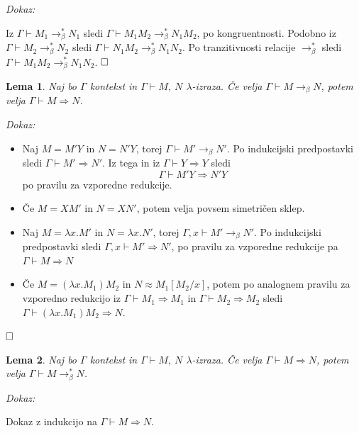 \documentclass{article}
\def\qed{$\hfill\Box$}   %
\newtheorem{lema}{Lema}
\begin{document}
\noindent
{\em Dokaz:\/}

Iz \(\Gamma \vdash M_1 \rightarrow_\beta^* N_1\) sledi \(\Gamma \vdash M_1 M_2 \rightarrow_\beta^* N_1 M_2\), po kongruentnosti. Podobno iz \(\Gamma \vdash M_2 \rightarrow_\beta^* N_2\) sledi \(\Gamma \vdash N_1 M_2 \rightarrow_\beta^* N_1 N_2\). Po tranzitivnosti relacije \(\rightarrow_\beta^*\) sledi \(\Gamma \vdash M_1 M_2 \rightarrow_\beta^* N_1 N_2\). \qed



\begin{lema}
    Naj bo \(\Gamma\) kontekst in \(\Gamma \vdash M,\ N\) \(\lambda\)-izraza. Če velja \(\Gamma \vdash M \rightarrow_\beta N\), potem velja \(\Gamma \vdash M \Rightarrow N\).
\end{lema}
\noindent
{\em Dokaz:\/}

\begin{itemize}
    \item Naj \(M = M' Y\) in \(N = N' Y\), torej \(\Gamma \vdash M' \rightarrow_\beta N'\). Po indukcijski predpostavki sledi \(\Gamma \vdash M' \Rightarrow N'\). Iz tega in iz \(\Gamma \vdash Y \Rightarrow Y\) sledi
    \[
        \Gamma \vdash M' Y \Rightarrow N' Y
    \] po pravilu za vzporedne redukcije.
    \item Če \(M = X M'\) in \(N = X N'\), potem velja povsem simetričen sklep.
    \item Naj \(M = \lambda x. M'\) in \(N = \lambda x. N'\), torej \(\Gamma, x \vdash M' \rightarrow_\beta N'\). Po indukcijski predpostavki sledi \(\Gamma, x \vdash M' \Rightarrow N'\), po pravilu za vzporedne redukcije pa \(\Gamma \vdash M \Rightarrow N\)
    \item Če \(M = (\lambda x. M_1) M_2\) in \(N \approx M_1[M_2/x]\), potem po analognem pravilu za vzporedno redukcijo iz \(\Gamma \vdash M_1 \Rightarrow M_1\) in \(\Gamma \vdash M_2 \Rightarrow M_2\) sledi \(\Gamma \vdash (\lambda x. M_1) M_2 \Rightarrow N\).
\end{itemize}

\qed

\begin{lema}
    Naj bo \(\Gamma\) kontekst in \(\Gamma \vdash M,\ N\) \(\lambda\)-izraza. Če velja \(\Gamma \vdash M \Rightarrow N\), potem velja \(\Gamma \vdash M \rightarrow_\beta^* N\).
\end{lema}
\noindent
{\em Dokaz:\/}

Dokaz z indukcijo na \(\Gamma \vdash M \Rightarrow N\).
\end{document}
